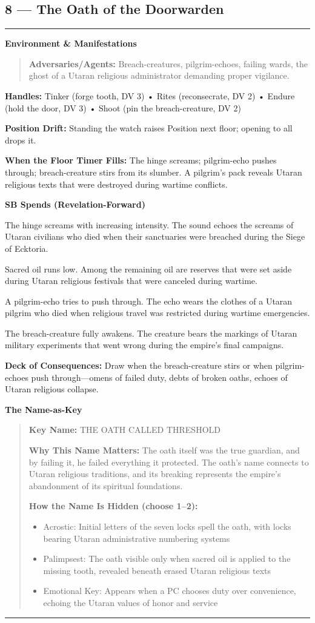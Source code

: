 \documentclass[18pt, letterpaper, twoside]{article}
\newenvironment{floorbox}[1]{%
    \begin{center}
    \begin{minipage}{0.95\textwidth}
    \subsection*{#1}
    \vspace{-0.5em}
    \rule{\textwidth}{0.5pt}
    \vspace{0.5em}
}{%
    \vspace{0.5em}
    \rule{\textwidth}{0.5pt}
    \end{minipage}
    \end{center}
}
\newenvironment{gmnote}[1]{%
    \vspace{0.5em}
    \noindent\textbf{#1}
    \begin{quote}
}{%
    \end{quote}
    \vspace{0.5em}
}
\newcommand{\handles}[1]{\noindent\textbf{Handles:} #1\par}
\newcommand{\sbitem}[2]{\item[#1 SB:] #2}
\newcommand{\deckdraw}[1]{\noindent\textbf{Deck of Consequences:} #1\par}
\newcommand{\keyname}[1]{\noindent\textbf{Key Name:} #1\par}
\newcommand{\nameimportance}[1]{\noindent\textbf{Why This Name Matters:} #1\par}
\begin{document}
\begin{floorbox}{8 --- The Oath of the Doorwarden}
\begin{gmnote}{Environment \& Manifestations}
\textbf{Adversaries/Agents:} Breach-creatures, pilgrim-echoes, failing wards, the ghost of a Utaran religious administrator demanding proper vigilance.
\end{gmnote}

\handles{Tinker (forge tooth, DV 3) • Rites (reconsecrate, DV 2) • Endure (hold the door, DV 3) • Shoot (pin the breach-creature, DV 2)}

\textbf{Position Drift:} Standing the watch raises Position next floor; opening to all drops it.

\textbf{When the Floor Timer Fills:} The hinge screams; pilgrim-echo pushes through; breach-creature stirs from its slumber. A pilgrim's pack reveals Utaran religious texts that were destroyed during wartime conflicts.

\textbf{SB Spends (Revelation-Forward)}
\begin{description}[leftmargin=*, style=unboxed]
    \sbitem{1}{The hinge screams with increasing intensity. The sound echoes the screams of Utaran civilians who died when their sanctuaries were breached during the Siege of Ecktoria.}
    \sbitem{2}{Sacred oil runs low. Among the remaining oil are reserves that were set aside during Utaran religious festivals that were canceled during wartime.}
    \sbitem{3}{A pilgrim-echo tries to push through. The echo wears the clothes of a Utaran pilgrim who died when religious travel was restricted during wartime emergencies.}
    \sbitem{4+}{The breach-creature fully awakens. The creature bears the markings of Utaran military experiments that went wrong during the empire's final campaigns.}
\end{description}

\deckdraw{Draw when the breach-creature stirs or when pilgrim-echoes push through---omens of failed duty, debts of broken oaths, echoes of Utaran religious collapse.}

\begin{gmnote}{The Name-as-Key}
\keyname{THE OATH CALLED THRESHOLD}
\nameimportance{The oath itself was the true guardian, and by failing it, he failed everything it protected. The oath's name connects to Utaran religious traditions, and its breaking represents the empire's abandonment of its spiritual foundations.}

\textbf{How the Name Is Hidden (choose 1--2):}
\begin{itemize}[leftmargin=*]
    \item Acrostic: Initial letters of the seven locks spell the oath, with locks bearing Utaran administrative numbering systems
    \item Palimpsest: The oath visible only when sacred oil is applied to the missing tooth, revealed beneath erased Utaran religious texts
    \item Emotional Key: Appears when a PC chooses duty over convenience, echoing the Utaran values of honor and service
\end{itemize}


\end{gmnote}
\end{floorbox}
\end{document}
